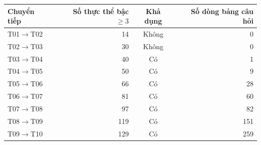 \begin{tabular}{lrcr}
\toprule
Chuyển tiếp & Số thực thể bậc $\geq 3$ & Khả dụng & Số dòng bảng câu hỏi \\
\midrule
T01$\to$T02 & 14 & Không & 0 \\
T02$\to$T03 & 30 & Không & 0 \\
T03$\to$T04 & 40 & Có & 1 \\
T04$\to$T05 & 50 & Có & 9 \\
T05$\to$T06 & 66 & Có & 28 \\
T06$\to$T07 & 81 & Có & 60 \\
T07$\to$T08 & 97 & Có & 82 \\
T08$\to$T09 & 119 & Có & 151 \\
T09$\to$T10 & 129 & Có & 259 \\
\bottomrule
\end{tabular}
